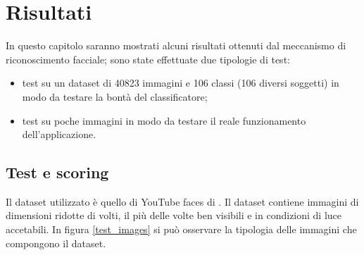 \chapter{Risultati}
In questo capitolo saranno mostrati alcuni risultati ottenuti dal meccanismo di riconoscimento facciale;
sono state effettuate due tipologie di test:
\begin{itemize}
	\item test su un dataset di 40823 immagini e 106 classi (106 diversi soggetti) in modo da testare la bontà del classificatore;
	\item test su poche immagini in modo da testare il reale funzionamento dell'applicazione.
\end{itemize}

\section{Test e scoring}
Il dataset utilizzato è quello di YouTube faces di \cite{wolf2011face}. Il dataset contiene immagini di dimensioni ridotte di volti, il più delle volte ben visibili e in condizioni di luce accetabili. In figura \ref{test_images} si può osservare la tipologia delle immagini che compongono il dataset. 

